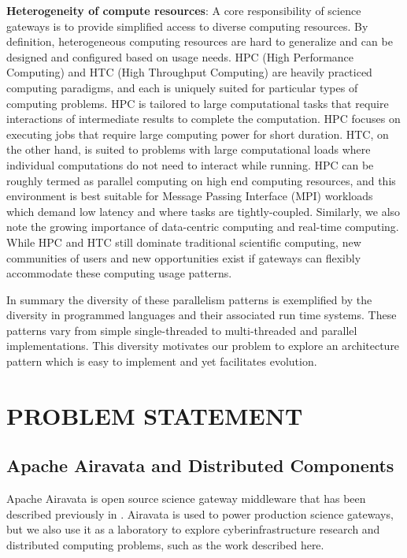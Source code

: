 \documentclass[review]{elsarticle}
\begin{document}
\textbf{Heterogeneity of compute resources}: A core responsibility of science gateways is to provide simplified access to diverse computing resources.  By definition, heterogeneous computing resources are hard to generalize and can be designed and configured based on usage needs. HPC (High Performance Computing) and HTC (High Throughput Computing) are heavily practiced computing paradigms, and each is uniquely suited for particular types of computing problems. HPC is tailored to large computational tasks that require interactions of intermediate results to complete the computation.  HPC focuses on executing jobs that require large computing power for short duration. HTC, on the other hand, is suited to problems with large computational loads where individual computations do not need to interact while running.   HPC can be roughly termed as parallel computing on high end computing resources, and this environment is best suitable for Message Passing Interface (MPI) workloads which demand low latency and where tasks are tightly-coupled.  Similarly, we also note the growing importance of data-centric computing and real-time computing. While HPC and HTC still dominate traditional scientific computing, new communities of users and new opportunities exist if gateways can flexibly accommodate these computing usage patterns. 

In summary the diversity of these parallelism patterns is exemplified by the diversity in programmed languages and their associated run time systems. These patterns  vary from simple single-threaded to multi-threaded and parallel implementations. This diversity motivates our problem to explore an architecture pattern which is easy to implement and yet facilitates evolution. 

\section{PROBLEM STATEMENT}

\subsection{Apache Airavata and Distributed Components}
Apache Airavata is open source science gateway middleware that has been described previously in \cite{pierce2014apache}\cite{marru2015apache}. Airavata is used to power production science gateways, but we also use it as a laboratory to explore cyberinfrastructure research and distributed computing problems, such as the work described here.
\end{document}
